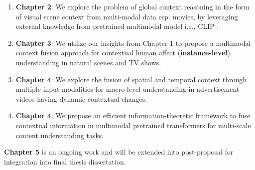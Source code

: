 \begin{enumerate}
    \item \textbf{Chapter 2}: We explore the problem of global context reasoning in the form of visual scene context from multi-modal data esp. movies, by leveraging external knowledge from pretrained multimodal model i.e., CLIP \cite{Radford2021LearningTV}.
    \item \textbf{Chapter 3}: We utilize our insights from Chapter 1 to propose a multimodal context fusion approach for contextual human affect (\textbf{instance-level}) understanding in natural scenes and TV shows.
    \item \textbf{Chapter 4}: We explore the fusion of spatial and temporal context through multiple input modalities for macro-level understanding in advertisement videos having dynamic contextual changes. 
    \item \textbf{Chapter 4}: We propose an efficient information-theoretic framework to fuse contextual information in multimodal pretrained transformers for multi-scale content understanding tasks.
\end{enumerate}

\textbf{Chapter 5} is an ongoing work and will be extended into post-proposal for integration into final thesis dissertation.
